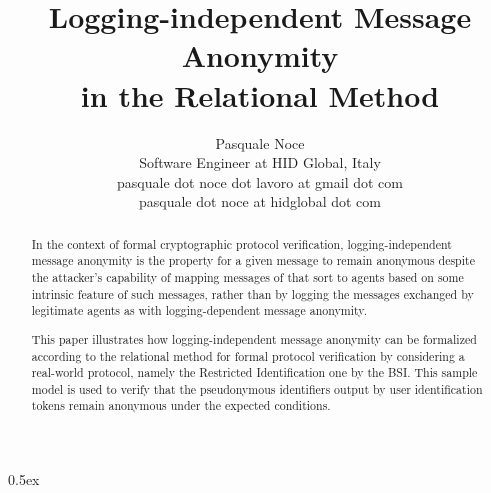 \documentclass[11pt,a4paper,fleqn]{article}
\begin{document}
\title{Logging-independent Message Anonymity\\in the Relational Method}
\author{Pasquale Noce\\Software Engineer at HID Global, Italy\\pasquale dot noce dot lavoro at gmail dot com\\pasquale dot noce at hidglobal dot com}
\maketitle

\begin{abstract}
In the context of formal cryptographic protocol verification, logging-independent message anonymity
is the property for a given message to remain anonymous despite the attacker's capability of mapping
messages of that sort to agents based on some intrinsic feature of such messages, rather than by
logging the messages exchanged by legitimate agents as with logging-dependent message anonymity.

This paper illustrates how logging-independent message anonymity can be formalized according to the
relational method for formal protocol verification by considering a real-world protocol, namely the
Restricted Identification one by the BSI. This sample model is used to verify that the pseudonymous
identifiers output by user identification tokens remain anonymous under the expected conditions.
\end{abstract}

\tableofcontents

\parindent 0pt\parskip 0.5ex





\end{document}
